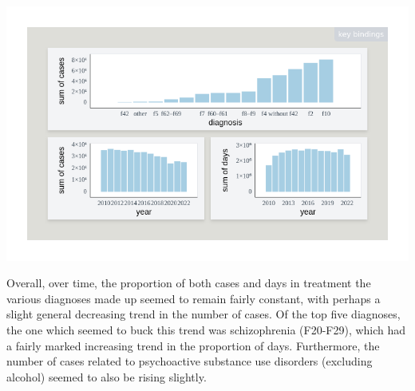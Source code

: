 \documentclass[
]{book}
\newenvironment{Shaded}{\begin{snugshade}}{\end{snugshade}}
\newcommand{\AttributeTok}[1]{\textcolor[rgb]{0.13,0.29,0.53}{#1}}
\newcommand{\ConstantTok}[1]{\textcolor[rgb]{0.56,0.35,0.01}{#1}}
\newcommand{\DecValTok}[1]{\textcolor[rgb]{0.00,0.00,0.81}{#1}}
\newcommand{\FunctionTok}[1]{\textcolor[rgb]{0.13,0.29,0.53}{\textbf{#1}}}
\newcommand{\NormalTok}[1]{#1}
\newcommand{\SpecialCharTok}[1]{\textcolor[rgb]{0.81,0.36,0.00}{\textbf{#1}}}
\newcommand{\StringTok}[1]{\textcolor[rgb]{0.31,0.60,0.02}{#1}}
\theoremstyle{definition}
\theoremstyle{definition}
\theoremstyle{definition}
\theoremstyle{definition}
\theoremstyle{remark}
\begin{document}
\begin{Shaded}
\end{Shaded}

\begin{center}\includegraphics[width=1\linewidth,height=1\textheight]{./figures/example-cases-diagnosis-time} \end{center}

Overall, over time, the proportion of both cases and days in treatment the various diagnoses made up seemed to remain fairly constant, with perhaps a slight general decreasing trend in the number of cases. Of the top five diagnoses, the one which seemed to buck this trend was schizophrenia (F20-F29), which had a fairly marked increasing trend in the proportion of days. Furthermore, the number of cases related to psychoactive substance use disorders (excluding alcohol) seemed to also be rising slightly.
\end{document}
